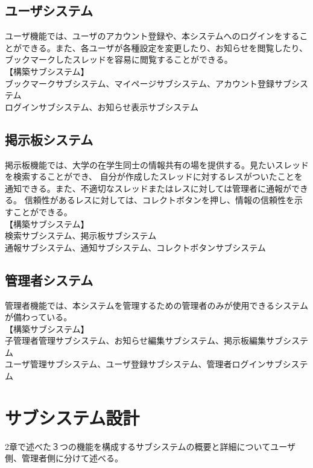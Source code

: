 \documentclass[a4j]{jarticle}
\begin{document}
\subsection{ユーザシステム}
 ユーザ機能では、ユーザのアカウント登録や、本システムへのログインをすることができる。また、各ユーザが各種設定を変更したり、お知らせを閲覧したり、ブックマークしたスレッドを容易に閲覧することができる。
\\【構築サブシステム】
\\ ブックマークサブシステム、マイページサブシステム、アカウント登録サブシステム
\\ ログインサブシステム、お知らせ表示サブシステム

\subsection{掲示板システム}
 掲示板機能では、大学の在学生同士の情報共有の場を提供する。見たいスレッドを検索することができ、
 自分が作成したスレッドに対するレスがついたことを通知できる。また、不適切なスレッドまたはレスに対しては管理者に通報ができる。
 信頼性があるレスに対しては、コレクトボタンを押し、情報の信頼性を示すことができる。
\\【構築サブシステム】
\\ 検索サブシステム、掲示板サブシステム
\\ 通報サブシステム、通知サブシステム、コレクトボタンサブシステム

\subsection{管理者システム}
 管理者機能では、本システムを管理するための管理者のみが使用できるシステムが備わっている。
\\【構築サブシステム】
\\ 子管理者管理サブシステム、お知らせ編集サブシステム、掲示板編集サブシステム
\\ ユーザ管理サブシステム、ユーザ登録サブシステム、管理者ログインサブシステム

\section{サブシステム設計}
2章で述べた３つの機能を構成するサブシステムの概要と詳細についてユーザ側、管理者側に分けて述べる。
\end{document}
